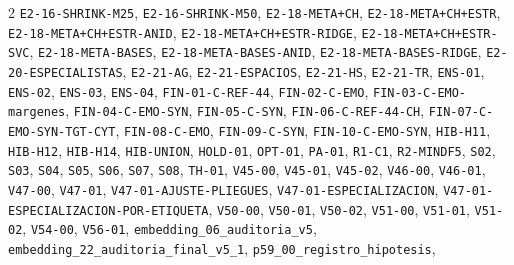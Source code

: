 \begin{multicols}{2}
\texttt{E2-\allowbreak{}16-\allowbreak{}SHRINK-\allowbreak{}M25}, \texttt{E2-\allowbreak{}16-\allowbreak{}SHRINK-\allowbreak{}M50}, \texttt{E2-\allowbreak{}18-\allowbreak{}META+\allowbreak{}CH}, \texttt{E2-\allowbreak{}18-\allowbreak{}META+\allowbreak{}CH+\allowbreak{}ESTR}, \texttt{E2-\allowbreak{}18-\allowbreak{}META+\allowbreak{}CH+\allowbreak{}ESTR-\allowbreak{}ANID}, \texttt{E2-\allowbreak{}18-\allowbreak{}META+\allowbreak{}CH+\allowbreak{}ESTR-\allowbreak{}RIDGE}, \texttt{E2-\allowbreak{}18-\allowbreak{}META+\allowbreak{}CH+\allowbreak{}ESTR-\allowbreak{}SVC}, \texttt{E2-\allowbreak{}18-\allowbreak{}META-\allowbreak{}BASES}, \texttt{E2-\allowbreak{}18-\allowbreak{}META-\allowbreak{}BASES-\allowbreak{}ANID}, \texttt{E2-\allowbreak{}18-\allowbreak{}META-\allowbreak{}BASES-\allowbreak{}RIDGE}, \texttt{E2-\allowbreak{}20-\allowbreak{}ESPECIALISTAS}, \texttt{E2-\allowbreak{}21-\allowbreak{}AG}, \texttt{E2-\allowbreak{}21-\allowbreak{}ESPACIOS}, \texttt{E2-\allowbreak{}21-\allowbreak{}HS}, \texttt{E2-\allowbreak{}21-\allowbreak{}TR}, \texttt{ENS-\allowbreak{}01}, \texttt{ENS-\allowbreak{}02}, \texttt{ENS-\allowbreak{}03}, \texttt{ENS-\allowbreak{}04}, \texttt{FIN-\allowbreak{}01-\allowbreak{}C-\allowbreak{}REF-\allowbreak{}44}, \texttt{FIN-\allowbreak{}02-\allowbreak{}C-\allowbreak{}EMO}, \texttt{FIN-\allowbreak{}03-\allowbreak{}C-\allowbreak{}EMO-\allowbreak{}margenes}, \texttt{FIN-\allowbreak{}04-\allowbreak{}C-\allowbreak{}EMO-\allowbreak{}SYN}, \texttt{FIN-\allowbreak{}05-\allowbreak{}C-\allowbreak{}SYN}, \texttt{FIN-\allowbreak{}06-\allowbreak{}C-\allowbreak{}REF-\allowbreak{}44-\allowbreak{}CH}, \texttt{FIN-\allowbreak{}07-\allowbreak{}C-\allowbreak{}EMO-\allowbreak{}SYN-\allowbreak{}TGT-\allowbreak{}CYT}, \texttt{FIN-\allowbreak{}08-\allowbreak{}C-\allowbreak{}EMO}, \texttt{FIN-\allowbreak{}09-\allowbreak{}C-\allowbreak{}SYN}, \texttt{FIN-\allowbreak{}10-\allowbreak{}C-\allowbreak{}EMO-\allowbreak{}SYN}, \texttt{HIB-\allowbreak{}H11}, \texttt{HIB-\allowbreak{}H12}, \texttt{HIB-\allowbreak{}H14}, \texttt{HIB-\allowbreak{}UNION}, \texttt{HOLD-\allowbreak{}01}, \texttt{OPT-\allowbreak{}01}, \texttt{PA-\allowbreak{}01}, \texttt{R1-\allowbreak{}C1}, \texttt{R2-\allowbreak{}MINDF5}, \texttt{S02}, \texttt{S03}, \texttt{S04}, \texttt{S05}, \texttt{S06}, \texttt{S07}, \texttt{S08}, \texttt{TH-\allowbreak{}01}, \texttt{V45-\allowbreak{}00}, \texttt{V45-\allowbreak{}01}, \texttt{V45-\allowbreak{}02}, \texttt{V46-\allowbreak{}00}, \texttt{V46-\allowbreak{}01}, \texttt{V47-\allowbreak{}00}, \texttt{V47-\allowbreak{}01}, \texttt{V47-\allowbreak{}01-\allowbreak{}AJUSTE-\allowbreak{}PLIEGUES}, \texttt{V47-\allowbreak{}01-\allowbreak{}ESPECIALIZACION}, \texttt{V47-\allowbreak{}01-\allowbreak{}ESPECIALIZACION-\allowbreak{}POR-\allowbreak{}ETIQUETA}, \texttt{V50-\allowbreak{}00}, \texttt{V50-\allowbreak{}01}, \texttt{V50-\allowbreak{}02}, \texttt{V51-\allowbreak{}00}, \texttt{V51-\allowbreak{}01}, \texttt{V51-\allowbreak{}02}, \texttt{V54-\allowbreak{}00}, \texttt{V56-\allowbreak{}01}, \texttt{embedding\_\allowbreak{}06\_\allowbreak{}auditoria\_\allowbreak{}v5}, \texttt{embedding\_\allowbreak{}22\_\allowbreak{}auditoria\_\allowbreak{}final\_\allowbreak{}v5\_\allowbreak{}1}, \texttt{p59\_\allowbreak{}00\_\allowbreak{}registro\_\allowbreak{}hipotesis}, 
\end{multicols}
